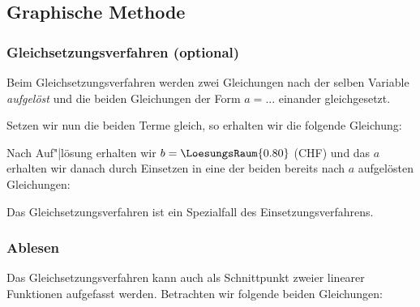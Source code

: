 \subsection{Graphische Methode}

\subsubsection{Gleichsetzungsverfahren (optional)}\label{lin_gl_gleichsetzungsverfahren}
Beim Gleichsetzungsverfahren werden zwei Gleichungen nach der selben Variable \textit{aufgelöst} und die beiden Gleichungen der Form $a = ...$ einander gleichgesetzt.

\vspace{22mm}

Setzen wir nun die beiden Terme gleich, so erhalten wir die
folgende Gleichung:


Nach Auf"|lösung erhalten wir $b=\LoesungsRaum{0.80}$ (CHF) und das
$a$ erhalten wir danach durch Einsetzen in eine der beiden bereits
nach $a$ aufgelösten Gleichungen:

Das Gleichsetzungsverfahren ist ein Spezialfall des
Einsetzungsverfahrens.
\newpage




\subsubsection{Ablesen}
Das Gleichsetzungsverfahren kann auch als Schnittpunkt zweier linearer Funktionen
aufgefasst werden. Betrachten wir folgende beiden Gleichungen:

